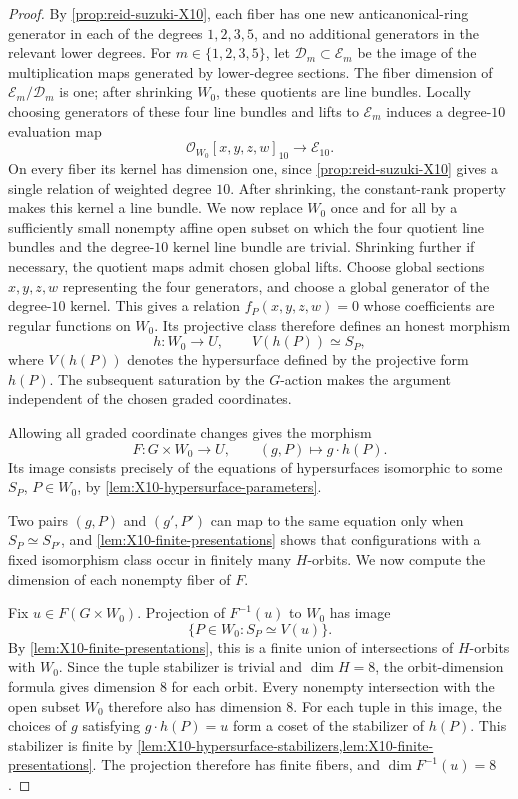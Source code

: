\documentclass[11pt]{article}
\theoremstyle{plain}
\theoremstyle{definition}
\theoremstyle{remark}
\newcommand{\OO}{\mathcal O}
\begin{document}
\begin{proof}
By \cref{prop:reid-suzuki-X10}, each fiber has one new anticanonical-ring
generator in each of the degrees \(1,2,3,5\), and no additional generators
in the relevant lower degrees. For \(m\in\{1,2,3,5\}\), let
\(\mathcal D_m\subset\mathcal E_m\) be the image of the multiplication maps
generated by lower-degree sections. The fiber dimension of
\(\mathcal E_m/\mathcal D_m\) is one; after shrinking \(W_0\), these
quotients are line bundles. Locally choosing generators of these four line
bundles and lifts to \(\mathcal E_m\) induces a degree-\(10\) evaluation map
\[
\OO_{W_0}[x,y,z,w]_{10}\longrightarrow\mathcal E_{10}.
\]
On every fiber its kernel has dimension one, since
\cref{prop:reid-suzuki-X10} gives a single relation of weighted degree
\(10\). After shrinking, the constant-rank property makes this kernel a
line bundle. We now replace \(W_0\) once and for all by a sufficiently small
nonempty affine open subset on which the four quotient line bundles and the
degree-\(10\) kernel line bundle are trivial. Shrinking further if necessary,
the quotient maps admit chosen global lifts. Choose global sections
\(x,y,z,w\) representing the four generators, and choose a global generator
of the degree-\(10\) kernel. This gives a relation
\(f_P(x,y,z,w)=0\) whose coefficients are regular functions on \(W_0\).
Its projective class therefore defines an honest morphism
\[
h:W_0\longrightarrow U,\qquad V(h(P))\simeq S_P,
\]
where \(V(h(P))\) denotes the hypersurface defined by the projective
form \(h(P)\). The subsequent saturation by the \(G\)-action makes the
argument independent of the chosen graded coordinates.

Allowing all graded coordinate changes gives the morphism
\[
F:G\times W_0\longrightarrow U,\qquad (g,P)\longmapsto g\cdot h(P).
\]
Its image consists precisely of the equations of hypersurfaces
isomorphic to some \(S_P\), \(P\in W_0\), by
\cref{lem:X10-hypersurface-parameters}.

Two pairs \((g,P)\) and \((g',P')\) can map to the same equation only when
\(S_P\simeq S_{P'}\), and \cref{lem:X10-finite-presentations} shows that
configurations with a fixed isomorphism class occur in finitely many
\(H\)-orbits. We now compute the dimension of each nonempty fiber of \(F\).

Fix \(u\in F(G\times W_0)\). Projection of \(F^{-1}(u)\) to
\(W_0\) has image
\[
\{P\in W_0:S_P\simeq V(u)\}.
\]
By \cref{lem:X10-finite-presentations}, this is a finite union of
intersections of \(H\)-orbits with \(W_0\). Since the tuple stabilizer is
trivial and \(\dim H=8\), the orbit-dimension formula
\cite[Proposition~I.1.8]{Borel1991} gives dimension \(8\) for each orbit.
Every nonempty intersection with the open subset \(W_0\) therefore also has
dimension \(8\).
For each tuple in this image, the choices of \(g\) satisfying
\(g\cdot h(P)=u\) form a coset of the stabilizer of \(h(P)\).
This stabilizer is finite by
\cref{lem:X10-hypersurface-stabilizers,lem:X10-finite-presentations}.
The projection therefore has finite fibers, and
\(\dim F^{-1}(u)=8\).


\end{proof}
\end{document}
